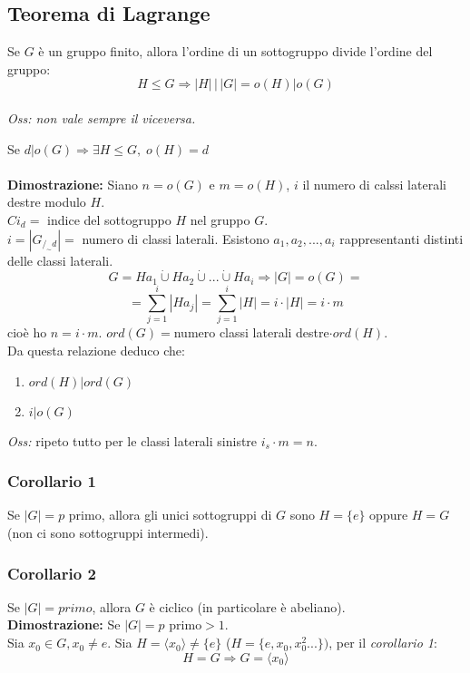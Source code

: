 \subsection{Teorema di Lagrange}
Se \(G\) è un gruppo finito, allora l'ordine di un sottogruppo divide l'ordine del gruppo:
\[H\leq G\Rightarrow |H|\,|\, |G| = o(H)|o(G)\] 
\\\textit{Oss: non vale sempre il viceversa.}

Se \(d|o(G)\Rightarrow\exists H\leq G,\; o(H)=d\)
\\\\\textbf{Dimostrazione:} Siano \(n=o(G)\) e \(m=o(H)\), \(i\) il numero di calssi laterali destre modulo \(H\).
\\\(Ci_d=\) indice del sottogruppo \(H\) nel gruppo \(G\).
\\\(i=|G_{/_\sim d}|=\) numero di classi laterali.
Esistono \(a_1,a_2,...,a_i\) rappresentanti distinti delle classi laterali.
\[G=Ha_1\dot\cup Ha_2\dot\cup...\dot\cup Ha_i\Rightarrow |G|=o(G)=\]
\[=\sum ^i_{j=1} |Ha_j|=\sum ^i_{j=1} |H|=i\cdot |H|=i\cdot m\]
cioè ho \(n=i\cdot m\). \(ord(G)=\)numero classi laterali destre\(\cdot ord(H)\).
\\Da questa relazione deduco che:
\begin{enumerate}

	\item \(ord(H)|ord(G)\)

	\item \(i|o(G)\)

\end{enumerate}

\textit{Oss:} ripeto tutto per le classi laterali sinistre \(i_s\cdot m=n\).

\subsubsection{Corollario 1}
Se \(|G|=p\) primo, allora gli unici sottogruppi di \(G\) sono \(H=\{e\}\) oppure \(H=G\) (non ci sono sottogruppi intermedi).

\subsubsection{Corollario 2}
Se \(|G|=primo\), allora \(G\) è ciclico (in particolare è abeliano).
\\
\textbf{Dimostrazione:} Se \(|G|=p\) primo\(>1\).
\\Sia \(x_0\in G, x_0\neq e\). Sia \(H=\langle x_0\rangle\neq \{e\}\) (\(H=\{e,x_0,x_0^2...\})\), per il \textit{corollario 1}: 
\[H=G\Rightarrow G=\langle x_0\rangle\]

